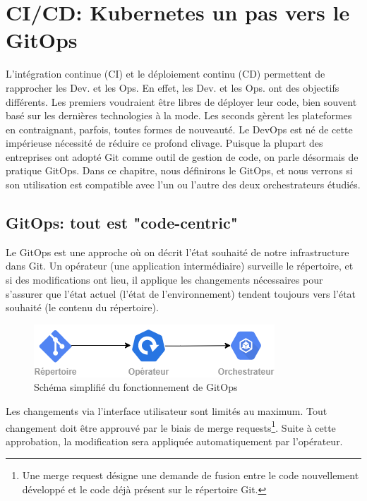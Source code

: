 \documentclass[11pt,fleqn]{book} %
\begin{document}
\chapter{CI/CD: Kubernetes un pas vers le GitOps}
\vspace{-2cm}
L'intégration continue (CI) et le déploiement continu (CD) permettent de rapprocher les Dev. et les Ops. En effet, les Dev. et les Ops. ont des objectifs différents. Les premiers voudraient être libres de déployer leur code, bien souvent basé sur les dernières technologies à la mode. Les seconds gèrent les plateformes en contraignant, parfois, toutes formes de nouveauté. Le DevOps est né de cette impérieuse nécessité de réduire ce profond clivage. Puisque la plupart des entreprises ont adopté Git comme outil de gestion de code, on parle désormais de pratique GitOps. Dans ce chapitre, nous définirons le GitOps, et nous verrons si son utilisation est compatible avec l'un ou l'autre des deux orchestrateurs étudiés.

\section{GitOps: tout est "code-centric"}
Le GitOps est une approche où on décrit l’état souhaité de notre infrastructure dans Git. Un opérateur (une application intermédiaire) surveille le répertoire, et si des modifications ont lieu, il applique les changements nécessaires pour s’assurer que l'état actuel (l’état de l’environnement) tendent toujours vers l’état souhaité (le contenu du répertoire). 

\begin{figure}[H]\centering
\renewcommand{\figurename}{Schéma}
\includegraphics[scale=0.8]{Pictures/CI-CD/gitops-Intro.png}
\captionsetup{margin=1.5cm,format=hang,justification=justified}
\caption[]{Schéma simplifié du fonctionnement de GitOps \newline}
\end{figure}

Les changements via l’interface utilisateur sont limités au maximum. Tout changement doit être approuvé par le biais de merge requests\footnote{Une merge request désigne une demande de fusion entre le code nouvellement développé et le code déjà présent sur le répertoire Git.}. Suite à cette approbation, la modification sera appliquée automatiquement par l’opérateur.\\
\end{document}
